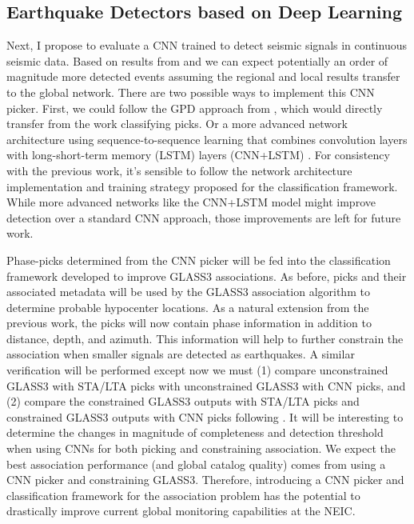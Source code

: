 \documentclass[12p]{article}
\begin{document}
\subsection{Earthquake Detectors based on Deep Learning}

Next, I propose to evaluate a CNN trained to detect seismic signals in continuous seismic data. Based on results from
\citet{Perol2018} and \citet{Ross2018b} we can expect potentially an order of magnitude more detected events assuming
the regional and local results transfer to the global network. There are two possible ways to implement this CNN picker.
First, we could follow the GPD approach from \citet{Ross2018b}, which would directly transfer from the work classifying
picks. Or a more advanced network architecture using sequence-to-sequence learning that combines convolution layers with
long-short-term memory (LSTM) layers (CNN+LSTM) \citep{Mousavi2019}. For consistency with the previous work, it's
sensible to follow the network architecture implementation and training strategy proposed for the classification
framework. While more advanced networks like the CNN+LSTM model might improve detection over a standard CNN approach,
those improvements are left for future work.

Phase-picks determined from the CNN picker will be fed into the classification framework developed to improve GLASS3
associations. As before, picks and their associated metadata will be used by the GLASS3 association algorithm to
determine probable hypocenter locations. As a natural extension from the previous work, the picks will now contain phase
information in addition to distance, depth, and azimuth. This information will help to further constrain the association
when smaller signals are detected as earthquakes. A similar verification will be performed except now we must (1)
compare unconstrained GLASS3 with STA/LTA picks with unconstrained GLASS3 with CNN picks, and (2) compare the
constrained GLASS3 outputs with STA/LTA picks and constrained GLASS3 outputs with CNN picks following \citet{Yeck2019}.
It will be interesting to determine the changes in magnitude of completeness and detection threshold when using CNNs for
both picking and constraining association. We expect the best association performance (and global catalog
quality) comes from using a CNN picker and constraining GLASS3. Therefore, introducing a CNN picker and classification
framework for the association problem has the potential to drastically improve current global monitoring capabilities at
the NEIC.
\end{document}
